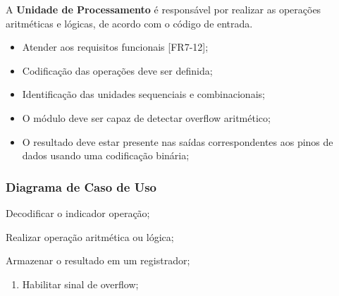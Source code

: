 \documentclass{article}
\begin{document}
  A \textbf{Unidade de Processamento} é responsável por realizar as operações aritméticas e lógicas, de acordo com o código de entrada.
  
  \actors
    \begin{description}
    \end{description}
  
  \preconditions 
    \begin{itemize}
     \item Atender aos requisitos funcionais [FR7-12];
     \item Codificação das operações deve ser definida;
     \item Identificação das unidades sequenciais e combinacionais;
    \end{itemize}

  \postconditions
    \begin{itemize}
     \item O módulo deve ser capaz de detectar overflow aritmético;
     \item O resultado deve estar presente nas saídas correspondentes aos pinos de dados usando uma codificação binária;
    \end{itemize}
  
  \subsubsection*{Diagrama de Caso de Uso}
  
 
  
  \begin{mainflow}
    \item Decodificar o indicador operação;
    \item Realizar operação aritmética ou lógica;
    \item Armazenar o resultado em um registrador;
  \end{mainflow}
  
  \begin{secondaryflow} 
    \begin{enumerate}
      \item Habilitar sinal de overflow;
    \end{enumerate}
  \end{secondaryflow}  
\end{document}
